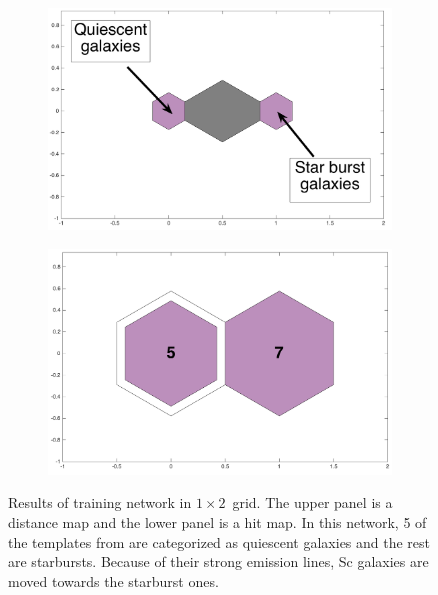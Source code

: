             \begin{figure}
                \begin{subfigure}[b]{0.45\textwidth}
                    \centering
                  \includegraphics[width=\textwidth]{images0.01/1d/dist_1_by_2.png}
                \end{subfigure}
                \hfill
                \begin{subfigure}[b]{0.45\textwidth}
                    \centering \includegraphics[width=\textwidth]{images0.01/1d/hit_t_1_by_2.png}
                \end{subfigure}
                \caption[Results of training network in $1\times2$~grid]{Results of training network in $1\times2$~grid. The upper panel is a distance map and the lower panel is a hit map. In this network, 5 of the templates from \citet{Kinney96} are categorized as quiescent galaxies and the rest are starbursts. Because of their strong emission lines, Sc galaxies are moved towards the starburst ones.}
                 \label{fig: 1by2T}
            \end{figure}
        
